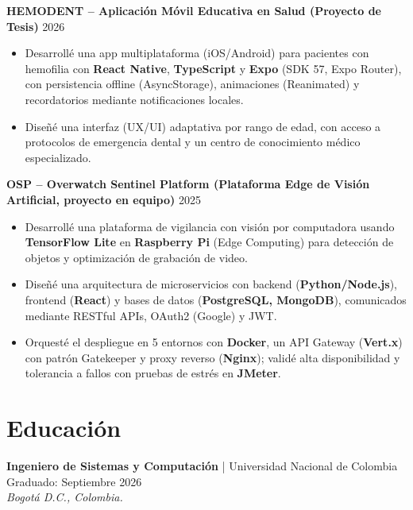 \documentclass[11pt,a4paper]{article}
\begin{document}
\vspace{0.2cm}

\noindent
\textbf{HEMODENT – Aplicación Móvil Educativa en Salud (Proyecto de Tesis)} \hfill 2026
\begin{itemize}[leftmargin=*, noitemsep, topsep=2pt]
    \item Desarrollé una app multiplataforma (iOS/Android) para pacientes con hemofilia con \textbf{React Native}, \textbf{TypeScript} y \textbf{Expo} (SDK 57, Expo Router), con persistencia offline (AsyncStorage), animaciones (Reanimated) y recordatorios mediante notificaciones locales.
    \item Diseñé una interfaz (UX/UI) adaptativa por rango de edad, con acceso a protocolos de emergencia dental y un centro de conocimiento médico especializado.
\end{itemize}

\vspace{0.2cm}

\noindent
\textbf{OSP – Overwatch Sentinel Platform (Plataforma Edge de Visión Artificial, proyecto en equipo)} \hfill 2025
\begin{itemize}[leftmargin=*, noitemsep, topsep=2pt]
    \item Desarrollé una plataforma de vigilancia con visión por computadora usando \textbf{TensorFlow Lite} en \textbf{Raspberry Pi} (Edge Computing) para detección de objetos y optimización de grabación de video.
    \item Diseñé una arquitectura de microservicios con backend (\textbf{Python/Node.js}), frontend (\textbf{React}) y bases de datos (\textbf{PostgreSQL, MongoDB}), comunicados mediante RESTful APIs, OAuth2 (Google) y JWT.
    \item Orquesté el despliegue en 5 entornos con \textbf{Docker}, un API Gateway (\textbf{Vert.x}) con patrón Gatekeeper y proxy reverso (\textbf{Nginx}); validé alta disponibilidad y tolerancia a fallos con pruebas de estrés en \textbf{JMeter}.
\end{itemize}

\section*{Educación}

\noindent
\textbf{Ingeniero de Sistemas y Computación} | Universidad Nacional de Colombia \hfill Graduado: Septiembre 2026 \\
\textit{Bogotá D.C., Colombia.}
\end{document}
